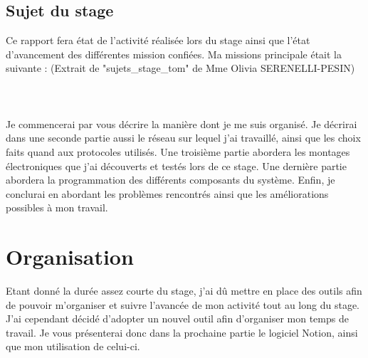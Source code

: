 \documentclass[12pt,french,a4paper]{article}
\begin{document}
\subsection{Sujet du stage}
Ce rapport fera état de l'activité réalisée lors du stage ainsi que l'état d'avancement des différentes mission confiées. Ma missions principale était la suivante : (Extrait de "sujets\_stage\_tom" de Mme Olivia SERENELLI-PESIN) 
\\
\\
\\
\\
Je commencerai par vous décrire la manière dont je me suis organisé. Je décrirai dans une seconde partie aussi le réseau sur lequel j'ai travaillé, ainsi que les choix faits quand aux protocoles utilisés. Une troisième partie abordera les montages électroniques que j'ai découverts et testés lors de ce stage. Une dernière partie abordera la programmation des différents composants du système. Enfin, je conclurai en abordant les problèmes rencontrés ainsi que les améliorations possibles à mon travail.

\newpage
\section{Organisation}
Etant donné la durée assez courte du stage, j'ai dû mettre en place des outils afin de pouvoir m'organiser et suivre l'avancée de mon activité tout au long du stage.
\\
J'ai cependant décidé d'adopter un nouvel outil afin d'organiser mon temps de travail. Je vous présenterai donc dans la prochaine partie le logiciel Notion, ainsi que mon utilisation de celui-ci.
\end{document}
